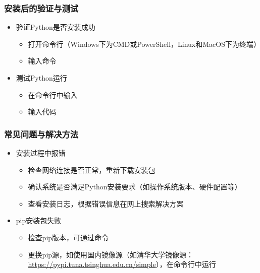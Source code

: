 \begin{frame}
    \frametitle{安装后的验证与测试}
    \begin{itemize}
        \item 验证Python是否安装成功
            \begin{itemize}
                \item 打开命令行（Windows下为CMD或PowerShell，Linux和MacOS下为终端）
                \item 输入命令%
            \end{itemize}
        \item 测试Python运行
            \begin{itemize}
                \item 在命令行中输入%
                \item 输入代码%
            \end{itemize}
    \end{itemize}
\end{frame}

\begin{frame}
    \frametitle{常见问题与解决方法}
    \begin{itemize}
        \item 安装过程中报错
            \begin{itemize}
                \item 检查网络连接是否正常，重新下载安装包
                \item 确认系统是否满足Python安装要求（如操作系统版本、硬件配置等）
                \item 查看安装日志，根据错误信息在网上搜索解决方案
            \end{itemize}
        \item pip安装包失败
            \begin{itemize}
                \item 检查pip版本，可通过命令%
                \item 更换pip源，如使用国内镜像源（如清华大学镜像源：\href{https://pypi.tuna.tsinghua.edu.cn/simple}{https://pypi.tuna.tsinghua.edu.cn/simple}），在命令行中运行%
            \end{itemize}
    \end{itemize}
\end{frame}

